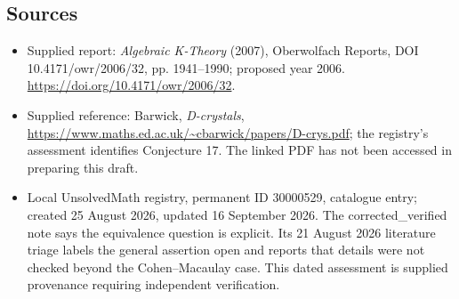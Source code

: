 \documentclass[11pt]{article}
\begin{document}
\subsection{Sources}
\begin{itemize}
\item Supplied report: \emph{Algebraic K-Theory} (2007), Oberwolfach Reports, DOI 10.4171/owr/2006/32, pp. 1941--1990; proposed year 2006. \url{https://doi.org/10.4171/owr/2006/32}.
\item Supplied reference: Barwick, \emph{D-crystals}, \url{https://www.maths.ed.ac.uk/~cbarwick/papers/D-crys.pdf}; the registry's assessment identifies Conjecture 17. The linked PDF has not been accessed in preparing this draft.
\item Local UnsolvedMath registry, permanent ID 30000529, catalogue entry; created 25 August 2026, updated 16 September 2026. The corrected\_verified note says the equivalence question is explicit. Its 21 August 2026 literature triage labels the general assertion open and reports that details were not checked beyond the Cohen--Macaulay case. This dated assessment is supplied provenance requiring independent verification.
\end{itemize}
\end{document}
